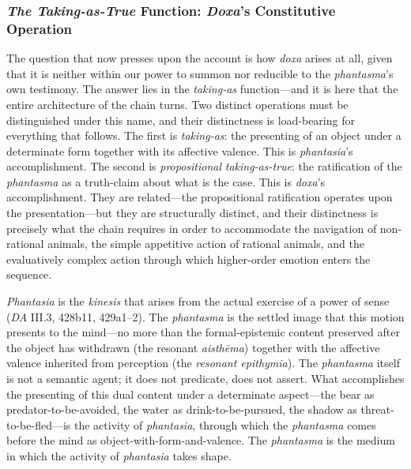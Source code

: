 \documentclass{article}
\begin{document}
\subsubsection*{\textit{The Taking-as-True} Function: \textit{Doxa}'s Constitutive Operation}

The question that now presses upon the account is how \textit{doxa} arises at all, given that it is neither within our power to summon nor reducible to the \textit{phantasma}'s own testimony. The answer lies in the \textit{taking-as} function---and it is here that the entire architecture of the chain turns. Two distinct operations must be distinguished under this name, and their distinctness is load-bearing for everything that follows. The first is \textit{taking-as}: the presenting of an object under a determinate form together with its affective valence. This is \textit{phantasia}'s accomplishment. The second is \textit{propositional} \textit{taking-as-true}: the ratification of the \textit{phantasma} as a truth-claim about what is the case. This is \textit{doxa}'s accomplishment. They are related---the propositional ratification operates upon the presentation---but they are structurally distinct, and their distinctness is precisely what the chain requires in order to accommodate the navigation of non-rational animals, the simple appetitive action of rational animals, and the evaluatively complex action through which higher-order emotion enters the sequence.

\textit{Phantasia} is the \textit{kinesis} that arises from the actual exercise of a power of sense (\textit{DA} III.3, 428b11, 429a1--2). The \textit{phantasma} is the settled image that this motion presents to the mind---no more than the formal-epistemic content preserved after the object has withdrawn (the resonant \textit{aisthēma}) together with the affective valence inherited from perception (the \textit{resonant epithymia}). The \textit{phantasma} itself is not a semantic agent; it does not predicate, does not assert. What accomplishes the presenting of this dual content under a determinate aspect---the bear as predator-to-be-avoided, the water as drink-to-be-pursued, the shadow as threat-to-be-fled---is the activity of \textit{phantasia}, through which the \textit{phantasma} comes before the mind as object-with-form-and-valence. The \textit{phantasma} is the medium in which the activity of \textit{phantasia} takes shape.
\end{document}
